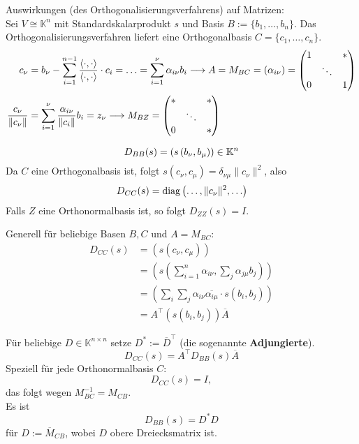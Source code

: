 \documentclass[parskip,a4paper,twoside,DIV15,BCOR12mm]{scrbook}
\begin{document}
Auswirkungen (des Orthogonalisierungsverfahrens) auf Matrizen:\\
Sei \(V\cong\mathbb{K}^{n}\) mit Standardskalarprodukt \(s\) und Basis
\(B:=\{b_{1},\ldots,b_{n}\}\).
Das Orthogonalisierungsverfahren liefert eine Orthogonalbasis 
\(C=\{c_{1},\ldots,c_{n}\}\).
\begin{align*}
c_{\nu}&=b_{\nu}-\sum_{i=1}^{n-1}{\frac{\operatorname{\langle\cdot,\cdot\rangle}}{\operatorname{\langle\cdot,\cdot\rangle}}\cdot c_{i}}=\ldots
    =\sum_{i=1}^{\nu}{\alpha_{i\nu}b_{i}}
    \longrightarrow A=M_{BC}=\left(\alpha_{i\nu}\right)=
    \begin{pmatrix}1&&*\\&\ddots&\\0&&1\end{pmatrix}\\
\frac{c_{\nu}}{\lVert c_{\nu}\rVert}
    &=\sum_{i=1}^{\nu}{\frac{\alpha_{i\nu}}{\lVert c_{i}\rVert}b_{i}}=z_{\nu}
    \longrightarrow M_{BZ}=
	\begin{pmatrix}*&&*\\&\ddots&\\0&&*\end{pmatrix}
\end{align*}
\begin{remind}[Darstellungsmatrix]
\[
D_{BB}(s)=\left(s\left(b_{\nu},b_{\mu}\right)\right)\in\mathbb{K}^{n}\\
\]
Da \(C\) eine Orthogonalbasis ist, folgt
\(s\left(c_{\nu},c_{\mu}\right)=\delta_{\nu\mu}\lVert c_{\nu}\rVert^{2}\), also
\[
D_{CC}(s)=\operatorname{diag}\left(\ldots,\lVert c_{\nu}\rVert^{2},\ldots\right)
\]
Falls \(Z\) eine Orthonormalbasis ist, so folgt \(D_{ZZ}(s)=I\).

Generell für beliebige Basen \(B,C\) und \(A=M_{BC}\):
\begin{align*}
D_{CC}(s)&=\left(s\left(c_{\nu},c_{\mu}\right)\right)\\
&=\left(s\left(\sum_{i=1}^{n}{\alpha_{i\nu}},\sum_{j}{\alpha_{j\mu}b_{j}}\right)\right)\\
&=\left(\sum_{i}{\sum_{j}{\alpha_{i\nu}\overline{\alpha_{i\mu}}\cdot s(b_{i},b_{j})}}\right)\\
&=A^{\top}\left(s(b_{i},b_{j})\right)\overline{A}
\end{align*}
\end{remind}
\begin{definition}
Für beliebige \(D\in\mathbb{K}^{n\times n}\) setze \(D^{*}:=\overline{D}^{\top}\) (die sogenannte \textbf{Adjungierte}).
\[
D_{CC}(s)=A^{\top}D_{BB}(s)\overline{A}
\]
Speziell für jede Orthonormalbasis \(C\):
\[
D_{CC}(s)=I,
\]
das folgt wegen \(M_{BC}^{-1}=M_{CB}\).\\
Es ist 
\[
D_{BB}(s)=D^{*}D
\]
für \(D:=\overline{M}_{CB}\), wobei \(D\) obere Dreiecksmatrix ist.
\end{definition}
\end{document}

